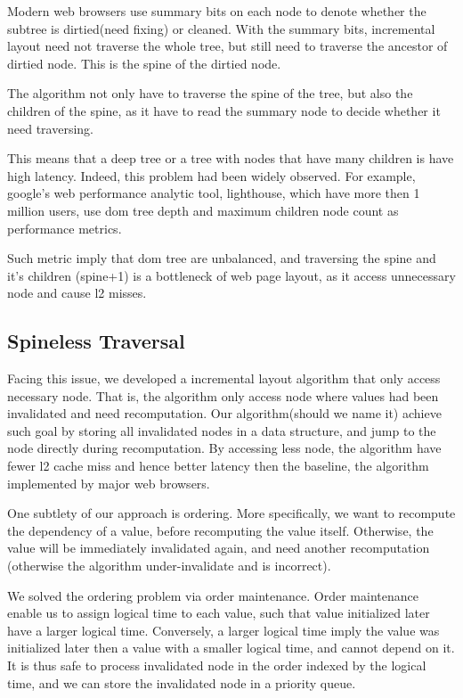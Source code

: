 \documentclass[format=acmsmall, review=false, screen=true]{acmart}
\begin{document}
Modern web browsers use summary bits on each node to denote whether the subtree is dirtied(need fixing) or cleaned. With the summary bits, incremental layout need not traverse the whole tree, but still need to traverse the ancestor of dirtied node. This is the spine of the dirtied node.

The algorithm not only have to traverse the spine of the tree, but also the children of the spine, as it have to read the summary node to decide whether it need traversing.

This means that a deep tree or a tree with nodes that have many children is have high latency. Indeed, this problem had been widely observed. For example, google's web performance analytic tool, lighthouse, which have more then 1 million users, use dom tree depth and maximum children node count as performance metrics.

Such metric imply that dom tree are unbalanced, and traversing the spine and it's children (spine+1) is a bottleneck of web page layout, as it access unnecessary node and cause l2 misses. 

\subsection{Spineless Traversal}
Facing this issue, we developed a incremental layout algorithm that only access necessary node. That is, the algorithm only access node where values had been invalidated and need recomputation. Our algorithm(should we name it) achieve such goal by storing all invalidated nodes in a data structure, and jump to the node directly during recomputation. By accessing less node, the algorithm have fewer l2 cache miss and hence better latency then the baseline, the algorithm implemented by major web browsers.

One subtlety of our approach is ordering. More specifically, we want to recompute the dependency of a value, before recomputing the value itself. Otherwise, the value will be immediately invalidated again, and need another recomputation (otherwise the algorithm under-invalidate and is incorrect).

We solved the ordering problem via order maintenance. Order maintenance enable us to assign logical time to each value, such that value initialized later have a larger logical time. Conversely, a larger logical time imply the value was initialized later then a value with a smaller logical time, and cannot depend on it. It is thus safe to process invalidated node in the order indexed by the logical time, and we can store the invalidated node in a priority queue.
\end{document}
